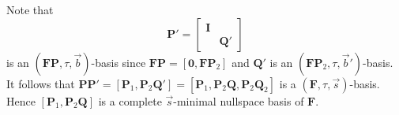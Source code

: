 \begin{pf}
Note that 
\[
\mathbf{P}'=\begin{bmatrix}\mathbf{I}\\
 & \mathbf{Q}'
\end{bmatrix}
\]
 is an $\left(\mathbf{F}\mathbf{P},\tau,\vec{b}\right)$-basis since
$\mathbf{F}\mathbf{P}=\left[\mathbf{0},\mathbf{F}\mathbf{P}_{2}\right]$
and $\mathbf{Q}'$ is an $\left(\mathbf{F}\mathbf{P}_{2},\tau,\vec{b}'\right)$-basis.
It follows that $\mathbf{P}\mathbf{P}'=\left[\mathbf{P}_{1},\mathbf{P}_{2}\mathbf{Q}'\right]=\left[\mathbf{P}_{1},\mathbf{P}_{2}\mathbf{Q},\mathbf{P}_{2}\mathbf{Q}_{2}\right]$
is a $\left(\mathbf{F},\tau,\vec{s}\right)$-basis. Hence $\left[\mathbf{P}_{1},\mathbf{P}_{2}\mathbf{Q}\right]$
is a complete $\vec{s}$-minimal nullspace basis of $\mathbf{F}$.\end{pf}
